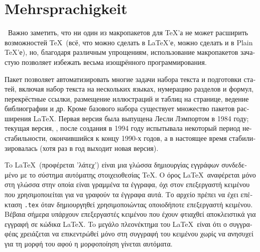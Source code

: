 \documentclass{scrartcl}
\begin{document}
	
\section{Mehrsprachigkeit}
	\begin{english}
		\blindtext
	\end{english}
	
	\blindtext 
	
	\begin{russian}\
		Важно заметить, что ни один из макропакетов для \TeX’а не может расширить возмож\-ностей \TeX\ (всё, что можно сделать в LaTeX’е, можно сделать и в Plain \TeX’е), но, благодаря различным упрощениям, использование макропакетов зачастую позволяет избежать весьма изощрённого программирования.

		Пакет позволяет автоматизировать многие задачи набора текста и подготовки статей, включая набор текста на нескольких языках, нумерацию разделов и формул, перекрёстные ссылки, размещение иллюстраций и таблиц на странице, ведение библиографии и др. Кроме базового набора существует множество пакетов расширения \LaTeX. Первая версия была выпущена Лесли Лэмпортом в 1984 году; текущая версия, \LaTeXe, после создания в 1994 году испытывала некоторый период нестабильности, окончившийся к концу 1990-х годов, а в настоящее время стабилизировалась (хотя раз в год выходит новая версия).
	\end{russian}
	
	\begin{french}
		\blindtext
	\end{french}

	\begin{greek}
		To \LaTeX\ (προφέρεται 'λάτεχ') είναι μια γλώσσα δημιουργίας εγγράφων συνδεδεμένο με το σύστημα αυτόματης στοιχειοθεσίας \TeX. Ο όρος \LaTeX\ αναφέρεται μόνο στη γλώσσα στην οποία είναι γραμμένα τα έγγραφα, όχι στον επεξεργαστή κειμένου που χρησιμοποιείται για να γραφούν τα έγγραφα αυτά. Το αρχείο πρέπει να έχει επέκταση \verb|.tex| όταν δημιουργηθεί χρησιμοποιώντας οποιοδήποτε επεξεργαστή κειμένου. Βέβαια σήμερα υπάρχουν επεξεργαστές κειμένου που έχουν φτιαχθεί αποκλειστικά για εγγραφή σε κώδικα \LaTeX. To μεγάλο πλεονέκτημα του \LaTeX\ είναι ότι ο συγγραφέας χρειάζεται να επικεντρώθεί μόνο στη συγγραφή του κειμένου χωρίς να ανησυχεί για τη μορφή του αφού η μορφοποίηση γίνεται αυτόματα.
	\end{greek}
\end{document}
